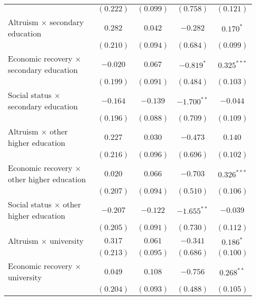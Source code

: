 \begin{table}
\begin{center}
\begin{tabular}{l c c c c}
                                                    & $(0.222)$      & $(0.099)$     & $(0.758)$     & $(0.121)$     \\
Altruism $\times$ secondary education               & $0.282$        & $0.042$       & $-0.282$      & $0.170^{*}$   \\
                                                    & $(0.210)$      & $(0.094)$     & $(0.684)$     & $(0.099)$     \\
Economic recovery $\times$ secondary education      & $-0.020$       & $0.067$       & $-0.819^{*}$  & $0.325^{***}$ \\
                                                    & $(0.199)$      & $(0.091)$     & $(0.484)$     & $(0.103)$     \\
Social status $\times$ secondary education          & $-0.164$       & $-0.139$      & $-1.700^{**}$ & $-0.044$      \\
                                                    & $(0.196)$      & $(0.088)$     & $(0.709)$     & $(0.109)$     \\
Altruism $\times$ other higher education            & $0.227$        & $0.030$       & $-0.473$      & $0.140$       \\
                                                    & $(0.216)$      & $(0.096)$     & $(0.696)$     & $(0.102)$     \\
Economic recovery $\times$ other higher education   & $0.020$        & $0.066$       & $-0.703$      & $0.326^{***}$ \\
                                                    & $(0.207)$      & $(0.094)$     & $(0.510)$     & $(0.106)$     \\
Social status $\times$ other higher education       & $-0.207$       & $-0.122$      & $-1.655^{**}$ & $-0.039$      \\
                                                    & $(0.205)$      & $(0.091)$     & $(0.730)$     & $(0.112)$     \\
Altruism $\times$ university                        & $0.317$        & $0.061$       & $-0.341$      & $0.186^{*}$   \\
                                                    & $(0.213)$      & $(0.095)$     & $(0.686)$     & $(0.100)$     \\
Economic recovery $\times$ university               & $0.049$        & $0.108$       & $-0.756$      & $0.268^{**}$  \\
                                                    & $(0.204)$      & $(0.093)$     & $(0.488)$     & $(0.105)$     \\

\end{tabular}
\end{center}
\end{table}
